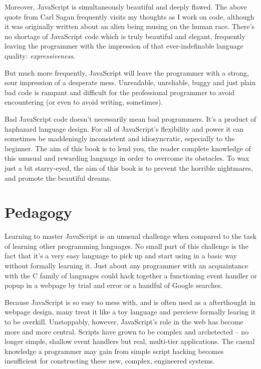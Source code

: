 \documentclass[11pt,letter]{book}
\begin{document}
    Moreover, JavaScript is simultaneously beautiful and deeply flawed. The above quote from Carl 
    Sagan frequently visits my thoughts as I work on code, although it was originally written about 
    an alien being musing on the human race. There's no shortage of JavaScript code which is truly 
    beautiful and elegant, frequently leaving the programmer with the impression of that 
    ever-indefinable language quality: \emph{expressiveness}.
    
    But much more frequently, JavaScript will leave the programmer with a strong, sour impression of 
    a desperate mess. Unreadable, unreliable, buggy and just plain bad code is rampant and difficult 
    for the professional programmer to avoid encountering (or even to avoid writing, sometimes).
    
    Bad JavaScript code doesn't necessarily mean bad programmers. It's a product of haphazard 
    language design. For all of JavaScript's flexibility and power it can sometimes be maddeningly 
    inconsistent and idiosyncratic, especially to the beginner. The aim of this book is to lend you, 
    the reader complete knowledge of this unusual and rewarding language in order to overcome its 
    obstacles. To wax just a bit starry-eyed, the aim of this book is to prevent the horrible 
    nightmares, and promote the beautiful dreams.
    
    \section*{Pedagogy}
    Learning to master JavaScript is an unusual challenge when compared to the task of learning 
    other programming languages. No small part of this challenge is the fact that it's a very easy 
    language to pick up and start using in a basic way without formally learning it. Just about any 
    programmer with an acquaintance with the C family of languages could hack together a functioning
    event handler or popup in a webpage by trial and error or a handful of Google searches.
    
    Because JavaScript is so easy to mess with, and is often used as a afterthought in webpage 
    design, many treat it like a toy language and percieve formally learing it to be overkill. 
    Unstoppably, however, JavaScript's role in the web has become more and more central. Scripts 
    have grown to be complex and archetected -- no longer simple, shallow event handlers but real, 
    multi-tier applications. The casual knowledge a programmer may gain from simple script hacking
    becomes insufficient for constructing these new, complex, engineered systems.
    
\end{document}
